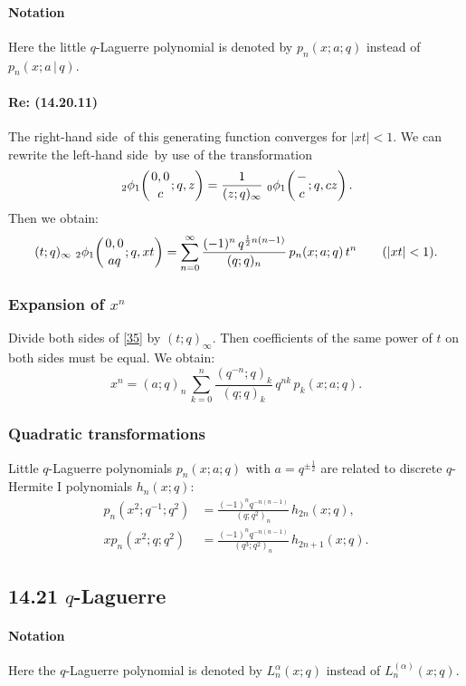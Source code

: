 \documentclass[twoside,11pt]{article}
\newcommand\al\alpha
\newcommand\half{\frac12}
\newcommand\iy\infty
\newcommand{\qhyp}[5]{\,\mbox{}_{#1}\phi_{#2}\!\left(
  \genfrac{}{}{0pt}{}{#3}{#4};#5\right)}
\newcommand\LHS{left-hand side}
\newcommand\RHS{right-hand side}
\begin{document}
\paragraph{Notation}
Here the little $q$-Laguerre polynomial is denoted by
$p_n(x;a;q)$ instead of
$p_n(x;a\,|\, q)$.
%
\paragraph{Re: (14.20.11)}
The \RHS\ of this generating function converges for $|xt|<1$.
We can rewrite the \LHS\ by use of the transformation
\begin{equation*}
\qhyp21{0,0}c{q,z}=\frac1{(z;q)_\iy}\,\qhyp01-c{q,cz}.
\end{equation*}
Then we obtain:
\begin{equation}
(t;q)_\iy\,\qhyp21{0,0}{aq}{q,xt}
=\sum_{n=0}^\iy\frac{(-1)^n\,q^{\half n(n-1)}}{(q;q)_n}\,
p_n(x;a;q)\,t^n\qquad(|xt|<1).
\label{35}
\end{equation}
%
\subsubsection*{Expansion of $x^n$}
Divide both sides of \eqref{35} by $(t;q)_\iy$. Then coefficients of the
same power of $t$ on both sides must be equal. We obtain:
\begin{equation}
x^n=(a;q)_n\,\sum_{k=0}^n \frac{(q^{-n};q)_k}{(q;q)_k}\,q^{nk}\,p_k(x;a;q).
\label{36}
\end{equation}
%
\subsubsection*{Quadratic transformations}
Little $q$-Laguerre polynomials $p_n(x;a;q)$ with $a=q^{\pm\half}$ are
related to discrete $q$-Hermite I polynomials $h_n(x;q)$:
\begin{align}
p_n(x^2;q^{-1};q^2)&=
\frac{(-1)^n q^{-n(n-1)}}{(q;q^2)_n}\,h_{2n}(x;q),
\label{28}\\
xp_n(x^2;q;q^2)&=
\frac{(-1)^n q^{-n(n-1)}}{(q^3;q^2)_n}\,h_{2n+1}(x;q).
\label{29}
\end{align}
%
\subsection*{14.21 $q$-Laguerre}
\label{sec14.21}
%
\paragraph{Notation}
Here the $q$-Laguerre polynomial is denoted by $L_n^\al(x;q)$ instead of
$L_n^{(\al)}(x;q)$.
%
\end{document}
